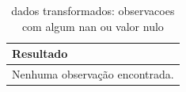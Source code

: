 \begin{table}[htbp]
\centering
\caption{dados transformados: observacoes com algum nan ou valor nulo}
\label{tab:dados-transformados-observacoes-com-algum-nan-ou-valor-nulo}
\small
\setlength{\tabcolsep}{6pt}
\renewcommand{\arraystretch}{1.08}
\begin{tabular}{l}
\toprule
\textbf{Resultado} \\
\midrule
Nenhuma observação encontrada. \\
\bottomrule
\end{tabular}
\end{table}
